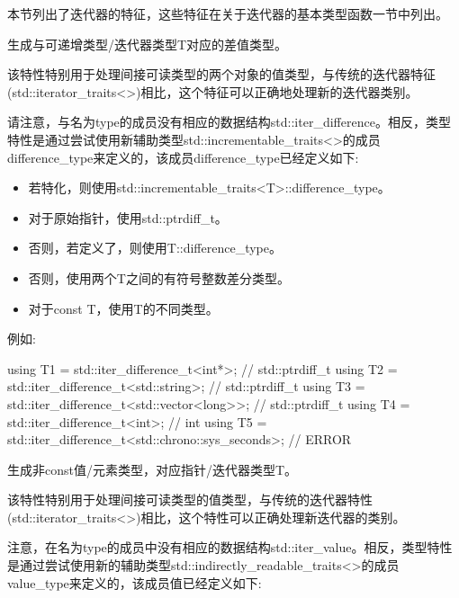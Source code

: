 

本节列出了迭代器的特征，这些特征在关于迭代器的基本类型函数一节中列出。



生成与可递增类型/迭代器类型T对应的差值类型。

该特性特别用于处理间接可读类型的两个对象的值类型，与传统的迭代器特征(std::iterator\_traits<>)相比，这个特征可以正确地处理新的迭代器类别。

请注意，与名为type的成员没有相应的数据结构std::iter\_difference。相反，类型特性是通过尝试使用新辅助类型std::incrementable\_traits<>的成员difference\_type来定义的，该成员difference\_type已经定义如下:

\begin{itemize}
\item 
若特化，则使用std::incrementable\_traits<T>::difference\_type。

\item
对于原始指针，使用std::ptrdiff\_t。

\item
否则，若定义了，则使用T::difference\_type。

\item
否则，使用两个T之间的有符号整数差分类型。

\item
对于const T，使用T的不同类型。
\end{itemize}

例如:

\begin{cpp}
using T1 = std::iter_difference_t<int*>; // std::ptrdiff_t
using T2 = std::iter_difference_t<std::string>; // std::ptrdiff_t
using T3 = std::iter_difference_t<std::vector<long>>; // std::ptrdiff_t
using T4 = std::iter_difference_t<int>; // int
using T5 = std::iter_difference_t<std::chrono::sys_seconds>; // ERROR
\end{cpp}



生成非const值/元素类型，对应指针/迭代器类型T。

该特性特别用于处理间接可读类型的值类型，与传统的迭代器特性(std::iterator\_traits<>)相比，这个特性可以正确处理新迭代器的类别。

注意，在名为type的成员中没有相应的数据结构std::iter\_value。相反，类型特性是通过尝试使用新的辅助类型std::indirectly\_readable\_traits<>的成员value\_type来定义的，该成员值已经定义如下:

